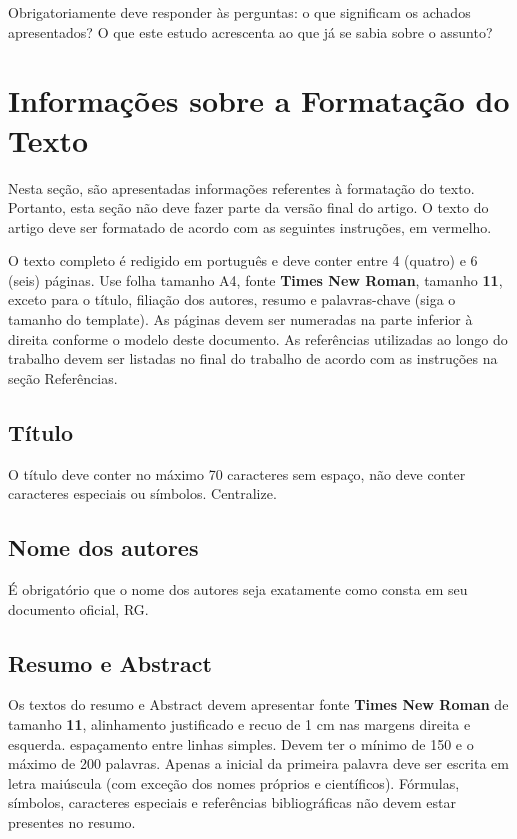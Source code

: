 \documentclass[%
  article,%
  a4paper,%
  11pt,%
  fleqn,%
  oneside,%
  chapter = TITLE,%
  section = TITLE,%
]{abntex2}
\begin{document}
Obrigatoriamente deve responder às perguntas: o que significam os achados apresentados? O que este estudo acrescenta ao que já se sabia sobre o assunto?

\section{Informações sobre a Formatação do Texto}\label{sec:texto}

Nesta seção, são apresentadas informações referentes à formatação do texto.
Portanto, esta seção não deve fazer parte da versão final do artigo.
O texto do artigo deve ser formatado de acordo com as seguintes instruções, em vermelho.

{\color{red} O texto completo é redigido em português e deve conter entre 4 (quatro) e 6 (seis) páginas. 
Use folha tamanho A4, fonte \textbf{Times New Roman}, tamanho \textbf{11}, exceto para o título, filiação dos autores, resumo e palavras-chave (siga o tamanho do template). 
As páginas devem ser numeradas na parte inferior à direita conforme o modelo deste documento.
As referências utilizadas ao longo do trabalho devem ser listadas no final do trabalho de acordo com as instruções na seção Referências.} %

\subsection{Título}
{\color{red} O título deve conter no máximo 70 caracteres sem espaço, não deve conter caracteres especiais ou símbolos. Centralize.}

\subsection{Nome dos autores}
{\color{red} É obrigatório que o nome dos autores seja exatamente como consta em seu documento oficial, RG.}

\subsection{Resumo e Abstract}\label{ssec:res}

{\color{red}Os textos do resumo e Abstract devem apresentar fonte \textbf{Times New Roman} de tamanho \textbf{11}, alinhamento justificado e recuo de 1 cm nas margens direita e esquerda. espaçamento entre linhas simples. Devem ter o mínimo de 150 e o máximo de 200 palavras. Apenas a inicial da primeira palavra deve ser escrita em letra maiúscula (com exceção dos nomes próprios e científicos). Fórmulas, símbolos, caracteres especiais e referências bibliográficas não devem estar presentes no resumo.}
\end{document}

